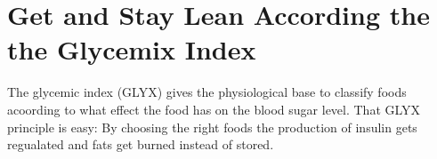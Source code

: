 \documentclass[../main.tex]{subfiles}
\begin{document}
\label{glycemic}

\section{Get and Stay Lean According the the Glycemix Index}

The glycemic index (GLYX) gives the physiological base to classify foods acoording to
what effect the food has on the blood sugar level.
That GLYX principle is easy: By choosing the right foods the production of insulin gets regualated and fats get burned instead of stored.
\end{document}
